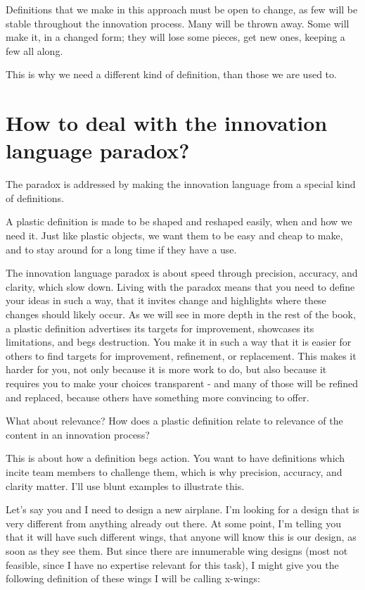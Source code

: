 Definitions that we make in this approach must be open to change, as few will be stable throughout the innovation process. Many will be thrown away. Some will make it, in a changed form; they will lose some pieces, get new ones, keeping a few all along. 

This is why we need a different kind of definition, than those we are used to.


\section{How to deal with the innovation language paradox?}
\label{c3:s3}
The paradox is addressed by making the innovation language from a special kind of definitions. 

A plastic definition is made to be shaped and reshaped easily, when and how we need it. Just like plastic objects, we want them to be easy and cheap to make, and to stay around for a long time if they have a use.

The innovation language paradox is about speed through precision, accuracy, and clarity, which slow down. Living with the paradox means that you need to define your ideas in such a way, that it invites change and highlights where these changes should likely occur. As we will see in more depth in the rest of the book, a plastic definition advertises its targets for improvement, showcases its limitations, and begs destruction. You make it in such a way that it is easier for others to find targets for improvement, refinement, or replacement. This makes it harder for you, not only because it is more work to do, but also because it requires you to make your choices transparent - and many of those will be refined and replaced, because others have something more convincing to offer.

What about relevance? How does a plastic definition relate to relevance of the content in an innovation process?

This is about how a definition begs action. You want to have definitions which incite team members to challenge them, which is why precision, accuracy, and clarity matter. I'll use blunt examples to illustrate this.

Let's say you and I need to design a new airplane. I'm looking for a design that is very different from anything already out there. At some point, I'm telling you that it will have such different wings, that anyone will know this is our design, as soon as they see them. But since there are innumerable wing designs (most not feasible, since I have no expertise relevant for this task), I might give you the following definition of these wings I will be calling x-wings:

